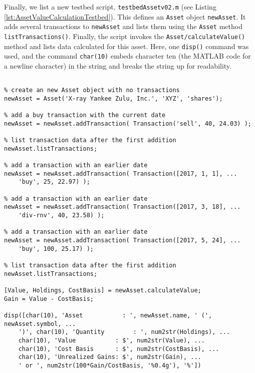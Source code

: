 Finally, we list a new testbed script, \texttt{testbedAssetv02.m} (see Listing \ref{lst:AssetValueCalculationTestbed}). This defines an \texttt{Asset} object \texttt{newAsset}. It adds several transactions to \texttt{newAsset} and lists them using the \texttt{Asset} method \texttt{listTransactions()}. Finally, the script invokes the \texttt{Asset/calculateValue()} method and lists data calculated for this asset. Here, one \texttt{disp()} command was used, and the command \texttt{char(10)} embeds character ten (the MATLAB code for a newline character) in the string and breaks the string up for readability.
\begin{lstlisting}[style=Matlab-editor, caption={A testbed function for \texttt{Asset} value calculations.}, label={lst:AssetValueCalculationTestbed}]
% testbedAssetv02.m

% create an new Asset object with no transactions
newAsset = Asset('X-ray Yankee Zulu, Inc.', 'XYZ', 'shares');

% add a buy transaction with the current date
newAsset = newAsset.addTransaction( Transaction('sell', 40, 24.03) );

% list transaction data after the first addition
newAsset.listTransactions;

% add a transaction with an earlier date
newAsset = newAsset.addTransaction( Transaction([2017, 1, 1], ...
    'buy', 25, 22.97) );

% add a transaction with an earlier date
newAsset = newAsset.addTransaction( Transaction([2017, 3, 18], ...
    'div-rnv', 40, 23.58) );

% add a transaction with an earlier date
newAsset = newAsset.addTransaction( Transaction([2017, 5, 24], ...
    'buy', 100, 25.17) );

% list transaction data after the first addition
newAsset.listTransactions;

[Value, Holdings, CostBasis] = newAsset.calculateValue;
Gain = Value - CostBasis;

disp([char(10), 'Asset           : ', newAsset.name, ' (', newAsset.symbol, ...
    ')', char(10), 'Quantity        : ', num2str(Holdings), ...
    char(10), 'Value           : $', num2str(Value), ...
    char(10), 'Cost Basis      : $', num2str(CostBasis), ...
    char(10), 'Unrealized Gains: $', num2str(Gain), ...
    ' or ', num2str(100*Gain/CostBasis, '%0.4g'), '%'])
\end{lstlisting}
